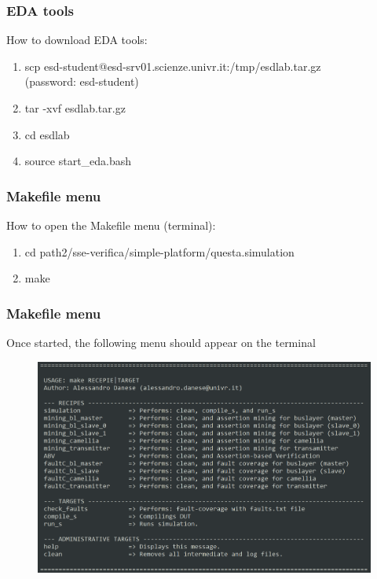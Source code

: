 \documentclass{beamer}
\begin{document}
\begin{frame}
\frametitle{EDA tools}

How to download EDA tools:

\begin{block}{}
\begin{enumerate}
	\item
	scp esd-student@esd-srv01.scienze.univr.it:/tmp/esdlab.tar.gz\\
	(password: esd-student)
	\item
	tar -xvf esdlab.tar.gz
	\item
	cd esdlab
	\item
	source start\_eda.bash
\end{enumerate}
\end{block}

\end{frame}


\begin{frame}

\frametitle{Makefile menu}
How to open the Makefile menu (terminal):
\begin{block}{}
	\begin{enumerate}
		\item 
		cd path2/sse-verifica/simple-platform/questa.simulation
		\item
		make
	\end{enumerate}
\end{block}

\end{frame}


\begin{frame}

\frametitle{Makefile menu}
Once started, the following menu should appear on the terminal

\begin{figure}
	\centering
	\includegraphics[width=0.9\columnwidth]{figures/makefile_menu.png}
\end{figure}
\end{frame}
\end{document}
